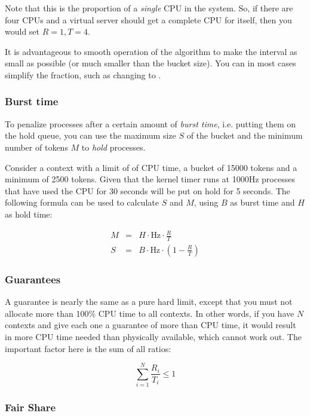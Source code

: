 Note that this is the proportion of a \emph{single} CPU in the system. So, if
there are four CPUs and a virtual server should get a complete CPU for itself,
then you would set $R=1, T=4$.

It is advantageous to smooth operation of the algorithm to make the interval as
small as possible (or much smaller than the bucket size). You can in most cases
simplify the fraction, such as changing  to .

\subsubsection{Burst time}

To penalize processes after a certain amount of \emph{burst time}, i.e. putting
them on the hold queue, you can use the maximum size $S$ of the bucket and the
minimum number of tokens $M$ to \emph{hold} processes.

Consider a context with a limit of  of CPU time, a bucket of
15000 tokens and a minimum of 2500 tokens. Given that the kernel timer runs at
1000Hz processes that have used the CPU for 30 seconds will be put on hold for
5 seconds. The following formula can be used to calculate $S$ and $M$, using
$B$ as burst time and $H$ as hold time:

\begin{eqnarray*}
M &=& H \cdot \mbox{Hz} \cdot \frac{R}{T}\\
S &=& B \cdot \mbox{Hz} \cdot \left (1 - \frac{R}{T} \right )
\end{eqnarray*}

\subsubsection{Guarantees}

A guarantee is nearly the same as a pure hard limit, except that you must not
allocate more than 100\% CPU time to all contexts. In other words, if you have
$N$ contexts and give each one a guarantee of more than  CPU
time, it would result in more CPU time needed than physically available, which
cannot work out. The important factor here is the sum of all ratios:

$$\sum_{i=1}^N \frac{R_i}{T_i} \le 1$$


\subsubsection{Fair Share}

